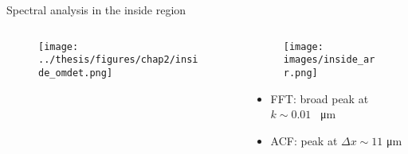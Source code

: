 \documentclass[aspectratio=169]{beamer}
\begin{document}
\begin{frame}{Spectral analysis in the inside region}
  \begin{columns}
    \begin{column}{0.7\textwidth}
      \begin{figure}
        \centering
        \texttt{[image: ../thesis/figures/chap2/inside\_omdet.png]}
      \end{figure}
    \end{column}
    \begin{column}{0.3\textwidth}
      \hspace{-0.2\textheight}
      \begin{figure}
        \centering
        \texttt{[image: images/inside\_arr.png]}
      \end{figure}
      \hspace{0.2\textheight}
      \begin{itemize}
        \item FFT: broad peak at $k \sim 0.01$ \unit{\per\micro\meter}
        \item ACF: peak at $\Delta x \sim 11$ \unit{\micro\meter}
      \end{itemize}
    \end{column}
  \end{columns}
  
\end{frame}

\end{document}
